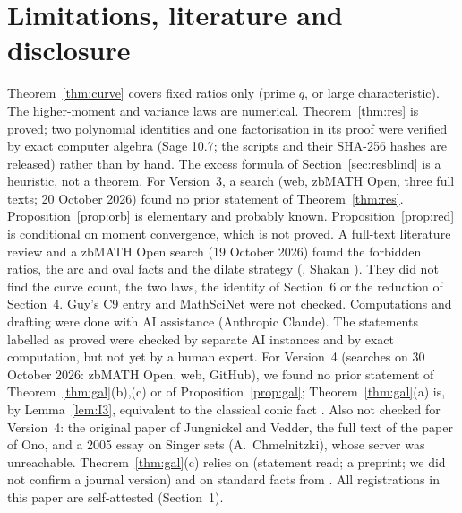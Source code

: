 \documentclass[11pt]{article}
\begin{document}
\section{Limitations, literature and disclosure}\label{sec:lim}
Theorem~\ref{thm:curve} covers fixed ratios only (prime $q$, or large characteristic). The higher-moment and variance laws are
numerical. Theorem~\ref{thm:res} is proved; two polynomial identities and one factorisation in its proof were verified by exact computer algebra (Sage 10.7; the scripts and their SHA-256 hashes are released) rather than by hand. The excess formula of Section~\ref{sec:resblind} is a heuristic, not a theorem. For Version~3, a search (web, zbMATH Open, three full texts; 20 October 2026) found no prior statement of Theorem~\ref{thm:res}. Proposition~\ref{prop:orb} is elementary and probably known. Proposition~\ref{prop:red} is conditional on moment convergence, which is not proved. A full-text literature review and a
zbMATH Open search (19 October 2026) found the forbidden ratios, the arc and oval facts \cite{JV,Pi} and the dilate strategy
(\cite{Go}, Shakan \cite{Sh}). They did not find the curve count, the two laws, the identity of Section~6 or the reduction of
Section~4. Guy's C9 entry and MathSciNet were not checked. Computations and drafting were done with AI assistance (Anthropic Claude).
The statements labelled as proved were checked by separate AI instances and by exact computation, but not yet by a human expert. For Version~4 (searches on 30 October 2026: zbMATH Open, web, GitHub), we found no prior statement of Theorem~\ref{thm:gal}(b),(c) or of Proposition~\ref{prop:gal}; Theorem~\ref{thm:gal}(a) is, by Lemma~\ref{lem:I3}, equivalent to the classical conic fact \cite{JV,Pi}. Also not checked for Version~4: the original paper of Jungnickel and Vedder, the full text of the paper of Ono, and a 2005 essay on Singer sets (A.~Chmelnitzki), whose server was unreachable. Theorem~\ref{thm:gal}(c) relies on \cite[Thm.~1.7]{BK} (statement read; a preprint; we did not confirm a journal version) and on standard facts from \cite{IR}. All registrations in this paper are self-attested (Section~1).
\end{document}
